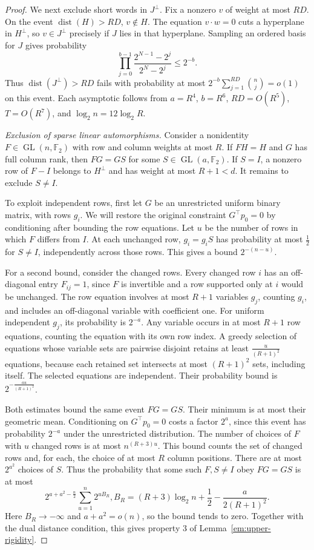 \documentclass[aps,prl,reprint,notitlepage,nofootinbib,nobibnotes]{revtex4-2}
\begin{document}
\begin{proof}
We next exclude short words in $J^\perp$. Fix a nonzero $v$ of weight at most $RD$. On the event
$\operatorname{dist}(H)>RD$, $v\notin H$. The equation $v\cdot w=0$ cuts a hyperplane in $H^\perp$,
so $v\in J^\perp$ precisely if $J$ lies in that hyperplane. Sampling an ordered basis for $J$ gives
probability
\[
 \prod_{j=0}^{b-1}\frac{2^{N-1}-2^j}{2^N-2^j}
 \le 2^{-b}.
\]
Thus $\operatorname{dist}(J^\perp)>RD$ fails with probability at most $2^{-b}\sum_{j=1}^{RD}\binom
nj=o(1)$ on this event. Each asymptotic follows from $a=R^4$, $b=R^6$, $RD=O(R^5)$, $T=O(R^7)$, and
$\log_2 n=12\log_2 R$.

\emph{Exclusion of sparse linear automorphisms.}
Consider a nonidentity $F\in\operatorname{GL}(n,\mathbb F_2)$ with row and column weights at most
$R$. If $FH=H$ and $G$ has full column rank, then $FG=GS$ for some $S\in\operatorname{GL}(a,\mathbb
F_2)$. If $S=I$, a nonzero row of $F-I$ belongs to $H^\perp$ and has weight at most $R+1<d$. It
remains to exclude $S\ne I$.

To exploit independent rows, first let $G$ be an unrestricted uniform binary matrix, with rows
$g_i$. We will restore the original constraint $G^\top p_0=0$ by conditioning after bounding the
row equations. Let $u$ be the number of rows in which $F$ differs from $I$. At each unchanged row,
$g_i=g_iS$ has probability at most $\frac{1}{2}$ for $S\ne I$, independently across those rows.
This gives a bound $2^{-(n-u)}$.

For a second bound, consider the changed rows. Every changed row $i$ has an off-diagonal entry
$F_{ij}=1$, since $F$ is invertible and a row supported only at $i$ would be unchanged. The row
equation involves at most $R+1$ variables $g_j$, counting $g_i$, and includes an off-diagonal
variable with coefficient one. For uniform independent $g_j$, its probability is $2^{-a}$. Any
variable occurs in at most $R+1$ row equations, counting the equation with its own row index. A
greedy selection of equations whose variable sets are pairwise disjoint retains at least
$\frac{u}{(R+1)^2}$ equations, because each retained set intersects at most $(R+1)^2$ sets,
including itself. The selected equations are independent. Their probability bound is
$2^{-\frac{au}{(R+1)^2}}$.

Both estimates bound the same event $FG=GS$. Their minimum is at most their geometric mean.
Conditioning on $G^\top p_0=0$ costs a factor $2^a$, since this event has probability $2^{-a}$
under the unrestricted distribution. The number of choices of $F$ with $u$ changed rows is at most
$n^{(R+3)u}$. This bound counts the set of changed rows and, for each, the choice of at most $R$
column positions. There are at most $2^{a^2}$ choices of $S$. Thus the probability that some such
$F,S\ne I$ obey $FG=GS$ is at most
\begin{equation}\label{em:upper-sparse-linear-count}
 2^{a+a^2-\frac{n}{2}}\sum_{u=1}^{n}2^{uB_R},
 B_R=(R+3)\log_2 n+\frac{1}{2}
             -\frac{a}{2(R+1)^2}.
\end{equation}
Here $B_R\to-\infty$ and $a+a^2=o(n)$, so the bound tends to zero. Together with the dual distance
condition, this gives property 3 of Lemma~\ref{em:upper-rigidity}.


\end{proof}
\end{document}
